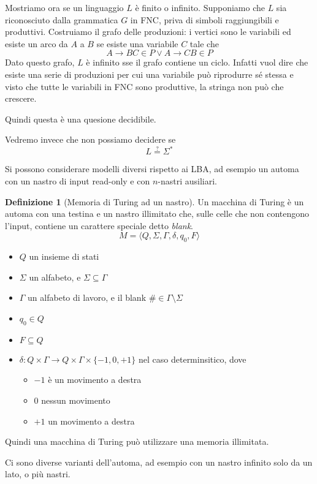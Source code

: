 \documentclass[12pt]{report}
\theoremstyle{definition}
\newtheorem{definizione}{Definizione}
\begin{document}
Mostriamo ora se un linguaggio $L$ è finito o infinito.
Supponiamo che $L$ sia riconosciuto dalla grammatica $G$ in FNC, priva di simboli raggiungibili e produttivi.
Costruiamo il grafo delle produzioni: i vertici sono le variabili ed esiste un arco da $A$ a $B$ se esiste una variabile $C$ tale che
$$ A \rightarrow BC \in P \vee A \rightarrow CB \in P $$
Dato questo grafo, $L$ è infinito sse il grafo contiene un ciclo.
Infatti vuol dire che esiste una serie di produzioni per cui una variabile può riprodurre sé stessa e visto che tutte le variabili in FNC sono produttive, la stringa non può che crescere.

Quindi questa è una quesione decidibile.

Vedremo invece che non possiamo decidere se 
$$ L \overset{?}{=} \Sigma^* $$


Si possono considerare modelli diversi rispetto ai LBA, ad esempio un automa con un nastro di input read-only e con $n$-nastri ausiliari.

\begin{definizione}[Memoria di Turing ad un nastro]
	Un macchina di Turing è un automa con una testina e un nastro illimitato che, sulle celle che non contengono l'input, contiene un carattere speciale detto \textit{blank}.
	$$ M = \langle Q, \Sigma, \Gamma, \delta, q_0, F \rangle $$
	\begin{itemize}
		\item $Q$ un insieme di stati
		\item $\Sigma$ un alfabeto, e $\Sigma \subseteq \Gamma$
		\item $\Gamma$ un alfabeto di lavoro, e il blank $\# \in \Gamma \setminus \Sigma$
		\item $q_0 \in Q$
		\item $F \subseteq Q$
		\item $\delta : Q \times \Gamma \rightarrow Q \times \Gamma \times \{-1, 0, +1\} $ nel caso determinsitico,
			dove
			\begin{itemize}
				\item $-1$ è un movimento a destra
				\item $0$ nessun movimento
				\item $+1$ un movimento a destra
			\end{itemize}
	\end{itemize}
\end{definizione}
Quindi una macchina di Turing può utilizzare una memoria illimitata.

Ci sono diverse varianti dell'automa, ad esempio con un nastro infinito solo da un lato, o più nastri.
\end{document}
